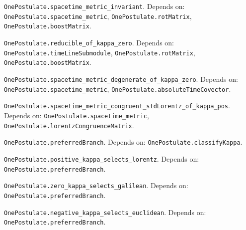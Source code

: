 \begin{lemma}\label{OnePostulate.spacetime_metric_invariant}
\texttt{OnePostulate.spacetime\_metric\_invariant}. Depends on: \texttt{OnePostulate.spacetime\_metric}, \texttt{OnePostulate.rotMatrix}, \texttt{OnePostulate.boostMatrix}.
\end{lemma}

\begin{lemma}\label{OnePostulate.reducible_of_kappa_zero}
\texttt{OnePostulate.reducible\_of\_kappa\_zero}. Depends on: \texttt{OnePostulate.timeLineSubmodule}, \texttt{OnePostulate.rotMatrix}, \texttt{OnePostulate.boostMatrix}.
\end{lemma}

\begin{lemma}\label{OnePostulate.spacetime_metric_degenerate_of_kappa_zero}
\texttt{OnePostulate.spacetime\_metric\_degenerate\_of\_kappa\_zero}. Depends on: \texttt{OnePostulate.spacetime\_metric}, \texttt{OnePostulate.absoluteTimeCovector}.
\end{lemma}

\begin{lemma}\label{OnePostulate.spacetime_metric_congruent_stdLorentz_of_kappa_pos}
\texttt{OnePostulate.spacetime\_metric\_congruent\_stdLorentz\_of\_kappa\_pos}. Depends on: \texttt{OnePostulate.spacetime\_metric}, \texttt{OnePostulate.lorentzCongruenceMatrix}.
\end{lemma}

\begin{definition}\label{OnePostulate.preferredBranch}
\texttt{OnePostulate.preferredBranch}. Depends on: \texttt{OnePostulate.classifyKappa}.
\end{definition}

\begin{lemma}\label{OnePostulate.positive_kappa_selects_lorentz}
\texttt{OnePostulate.positive\_kappa\_selects\_lorentz}. Depends on: \texttt{OnePostulate.preferredBranch}.
\end{lemma}

\begin{lemma}\label{OnePostulate.zero_kappa_selects_galilean}
\texttt{OnePostulate.zero\_kappa\_selects\_galilean}. Depends on: \texttt{OnePostulate.preferredBranch}.
\end{lemma}

\begin{lemma}\label{OnePostulate.negative_kappa_selects_euclidean}
\texttt{OnePostulate.negative\_kappa\_selects\_euclidean}. Depends on: \texttt{OnePostulate.preferredBranch}.
\end{lemma}

